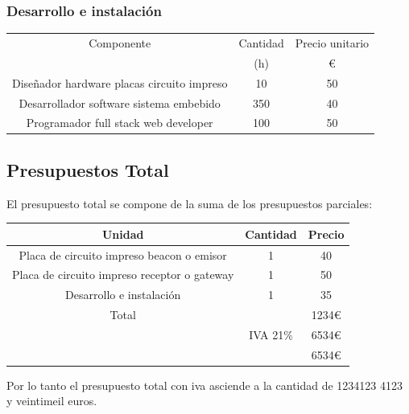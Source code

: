 \documentclass[a4paper ,12pt, onecolumn]{article}
\begin{document}
            \subsubsection{Desarrollo e instalación}
            \begin{center}
                \begin{tabular}{||c | c |c ||} 
                \hline
                Componente & Cantidad  & Precio unitario  \\ [0.5ex] 
                 & (h) & € \\ [0.5ex] 
                \hline\hline
                    Diseñador hardware placas circuito impreso   & 10  & 50 \\ 
                    Desarrollador  software sistema embebido     & 350 & 40 \\ 
                    Programador full stack web developer         & 100 & 50 \\ 
                \hline
                \end{tabular}
            \end{center}
    \subsection{Presupuestos Total}
        El presupuesto total se compone de la suma de los presupuestos parciales:
        \begin{center}
            \begin{tabular}{||c | c |c ||} 
            \hline
            Unidad & Cantidad & Precio  \\ [0.5ex] 
            \hline\hline
            Placa de circuito impreso beacon o emisor & 1 & 40 \\ 
            Placa de circuito impreso receptor o gateway & 1 & 50 \\ 
            Desarrollo e instalación & 1 & 35 \\ 
            \hline
            \hline
            Total &  & 1234€ \\ 
             & IVA 21\%& 6534€ \\ 
             & & 6534€ \\ 
            \hline
            \end{tabular}
        \end{center}
        Por lo tanto el presupuesto total con iva asciende a la cantidad de 1234123 4123 y veintimeil euros.
\end{document}
